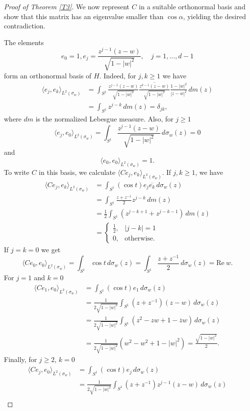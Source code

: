 \documentclass[10pt,a4paper]{amsart}
\newcommand\Real{\mathrm{Re}}
\def\bar{\overline}
\numberwithin{equation}{section}
\begin{document}
\begin{proof}[Proof of Theorem \ref{T3}]
 We now represent $C$ in a suitable orthonormal basis and show that this matrix has an  eigenvalue smaller than $\cos\alpha$, yielding the desired contradiction.
  
  The elements 
  \[e_0=1,e_j=\frac{z^{j-1}(z-w)}{\sqrt{1-|w|^2}},\quad j=1,\ldots,d-1\]	
form an orthonormal basis of $H$. Indeed, for $j,k\ge 1$ we have 
\begin{align*}\langle e_j,e_k\rangle_{L^2(\sigma_w)}&=\int_{S^1}\frac{z^{j-1}(z-w)}{\sqrt{1-|w|^2}}\overline{\frac{z^{k-1}(z-w)}{\sqrt{1-|w|^2}}}\frac{1-|w|^2}{|z-w|^2}\,dm(z)\\&=\int_{S^1}z^{j-k}\,dm(z)=\delta_{jk},
\end{align*}
where $dm$ is the normalized Lebesgue measure. Also, for $j\ge 1$
\[\langle e_j,e_0\rangle_{L^2(\sigma_w)}=\int_{S^1}\frac{z^{j-1}(z-w)}{\sqrt{1-|w|^2}}\,d\sigma_w(z)=0\]
and
\[\langle e_0,e_0\rangle_{L^2(\sigma_w)}=1.\]
 To write $C$ in this basis, we calculate $\langle Ce_j,e_k\rangle_{L^2(\sigma_w)}$. If $j,k\ge 1$, we have 
 \begin{align*}
 	\langle Ce_j,e_k\rangle_{L^2(\sigma_w)}&=\int_{S^1}(\cos t)e_j\overline{e_k}\,d\sigma_w(z)\\&=\int_{S^1}\frac{z+z^{-1}}{2}z^{j-k}\,dm(z)\\
 	&=\frac12\int_{S^1}(z^{j-k+1}+z^{j-k-1})\,dm(z)\\
 	&=\begin{cases}
    \frac12,&|j-k|=1\\
    0,& \text{otherwise.}
\end{cases}
\end{align*}
If $j=k=0$ we get
\[\langle Ce_0,e_0\rangle_{L^2(\sigma_w)}=\int_{S^1}\cos t\,d\sigma_w(z)=\int_{S^1}\frac{z+z^{-1}}{2}\,d\sigma_w(z)
=\Real\ w.\]
For $j=1$ and $k=0$
 \begin{align*}
 	\langle Ce_1,e_0\rangle_{L^2(\sigma_w)}&=\int_{S^1}(\cos t)e_1\,d\sigma_w(z)\\&=\frac{1}{2\sqrt{1-|w|^2}}\int_{S^1}(z+z^{-1})(z-w)\,d\sigma_w(z)\\
 	&=\frac{1}{2\sqrt{1-|w|^2}}\int_{S^1}(z^2-zw+1-\bar zw)\,d\sigma_w(z)\\
 	&=\frac{1}{2\sqrt{1-|w|^2}}(w^2-w^2+1-|w|^2)=\frac{\sqrt{1-|w|^2}}{2}.
 \end{align*}
Finally, for $j\ge 2$, $k=0$
\begin{align*}
 	\langle Ce_j,e_0\rangle_{L^2(\sigma_w)}&=\int_{S^1}(\cos t)e_j\,d\sigma_w(z)\\&=\frac{1}{2\sqrt{1-|w|^2}}\int_{S^1}(z+z^{-1})z^{j-1}(z-w)\,d\sigma_w(z)\\

\end{align*}
\end{proof}
\end{document}
